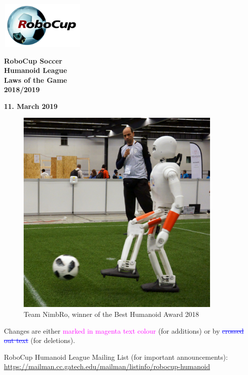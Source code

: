 \documentclass[a4paper]{article}
\title{}
\author{\rulesauthor}
\date{2018-11-04}
\newcommand{\removed}[1]{\textcolor{blue}{\sout{#1}}}
\newcommand{\added}[1]{\textcolor{magenta}{#1}}
\begin{document}
\sffamily

\begin{center}
\includegraphics[width=1.6264in,height=0.9055in]{img/robocup_logo.jpg}

{\Huge \bfseries
RoboCup Soccer
\\
Humanoid League
\\
Laws of the Game
\\ \vspace{0.5cm}
2018/2019}

\bigskip

{\bfseries 11. March 2019}
\end{center}

\begin{figure}[!h]
\centering
\includegraphics[height=4in]{img/nimbro_robot.jpg}
\captionsetup{labelformat=empty}
\caption{Team NimbRo, winner of the Best Humanoid Award 2018}
\end{figure}

{\large Changes are either \added{marked in magenta text colour} (for additions) or by  \removed{crossed out text} (for deletions).}

\bigskip
RoboCup Humanoid League Mailing List (for important announcements):\\
\url{https://mailman.cc.gatech.edu/mailman/listinfo/robocup-humanoid}
\end{document}
